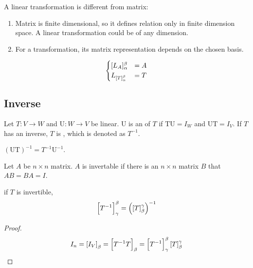 A linear transformation is different from matrix:
\begin{enumerate}
    \item Matrix is finite dimensional, so it defines relation only in finite dimension space. A linear transformation could be of any dimension.
    \item For a transformation, its matrix representation depends on the chosen basis.
\end{enumerate}



\begin{theorem}
    \begin{equation}
        \begin{aligned}
            \begin{cases}
            [L_A]_\alpha^\beta &= A \\
            L_{\coordinate{T}_\alpha^\beta} &= T
        \end{cases}    
        \end{aligned}
    \end{equation}
\end{theorem}


\subsection{Inverse}

\begin{definition}
	Let $T: V\rightarrow W$ and $\mathrm{U}:W \rightarrow V$ be linear. $\mathrm{U}$ is an    of $T$ if $\mathrm{TU} = I_W$ and $\mathrm{UT} = I_V$. If $T$ has an inverse, $T$ is   , which is denoted as $T^{-1}$.
\end{definition}

\begin{theorem}
    $(\mathrm{UT})^{-1} = T^{-1} \mathrm{U}^{-1}$.
\end{theorem}

\begin{definition}
	Let $A$ be $n \times n$ matrix. $A$ is invertable if there is an $n \times n$ matrix $B$ that $AB=BA=I$.
\end{definition}

\begin{theorem}
    if $T$ is invertible, 
	\begin{equation*}
		\coordinate{T^{-1}}_\gamma^\beta = \left(\coordinate{T}_\beta^\gamma \right)^{-1}
	\end{equation*}
\end{theorem}
\begin{proof}
	\begin{equation*}
		I_n = \coordinate{I_V}_\beta = \coordinate{T^{-1} T}_\beta = \coordinate{T^{-1}}_\gamma^\beta \coordinate{T}_\beta^\gamma
	\end{equation*}
\end{proof}

